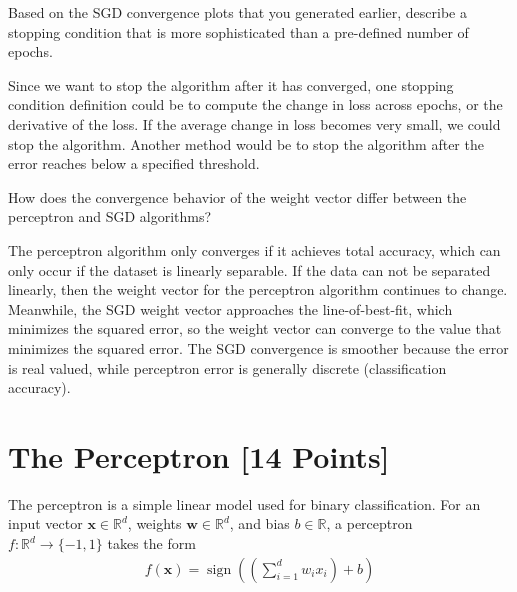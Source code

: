 \begin{problem}[2]
  Based on the SGD convergence plots that you generated earlier, describe a stopping condition that is more sophisticated than a pre-defined number of epochs.
\end{problem}
\begin{solution}
  Since we want to stop the algorithm after it has converged, one stopping condition definition could be to compute the change in loss across epochs, or the derivative of the loss. If the average change in loss becomes very small, we could stop the algorithm. Another method would be to stop the algorithm after the error reaches below a specified threshold.
\end{solution}

\begin{problem}[2]
How does the convergence behavior of the weight vector differ between the perceptron and SGD algorithms?
\end{problem}
\begin{solution}
  The perceptron algorithm only converges if it achieves total accuracy, which can only occur if the dataset is linearly separable. If the data can not be separated linearly, then the weight vector for the perceptron algorithm continues to change. Meanwhile, the SGD weight vector approaches the line-of-best-fit, which minimizes the squared error, so the weight vector can converge to the value that minimizes the squared error. The SGD convergence is smoother because the error is real valued, while perceptron error is generally discrete (classification accuracy).
\end{solution}



\newpage
\section{The Perceptron [14 Points]}

The perceptron is a simple linear model used for binary classification. For an input vector $\mathbf{x} \in \mathbb{R}^d$, weights $\mathbf{w} \in \mathbb{R}^d$, and bias $b \in \mathbb{R}$, a perceptron $f: \mathbb{R}^d \rightarrow \{-1,1\}$ takes the form
\begin{align*}
  f(\mathbf{x}) = \operatorname{sign}\left(\left(\sum_{i=1}^d w_i x_i\right) + b \right)
\end{align*}

